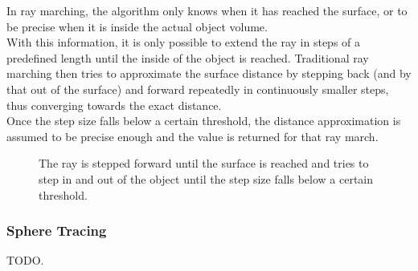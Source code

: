 \pagebreak
\noindent
In ray marching, the algorithm only knows when it has reached the surface, or to be precise when it is inside the actual object volume.
\\
With this information, it is only possible to extend the ray in steps of a predefined length until the inside of the object is reached.
Traditional ray marching then tries to approximate the surface distance by stepping back (and by that out of the surface) and forward repeatedly in continuously smaller steps, thus converging towards the exact distance.
\\
Once the step size falls below a certain threshold, the distance approximation is assumed to be precise enough and the value is returned for that ray march.

\begin{figure}[H]
    \centering
    \caption{The ray is stepped forward until the surface is reached and tries to step in and out of the object until the step size falls below a certain threshold.}
\end{figure}

\subsubsection{Sphere Tracing}
TODO.